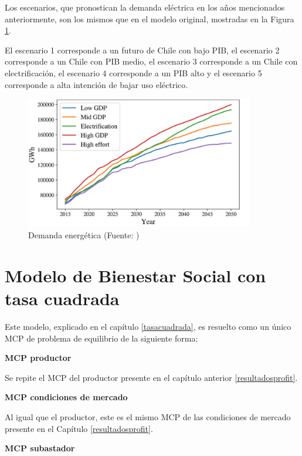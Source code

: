 Los escenarios, que pronostican la demanda eléctrica en los años mencionados anteriormente, son los mismos que en el modelo original, mostradas en la Figura \ref{fig:demandaescenarios}. 
\vspace{2.5mm}

El escenario 1 corresponde a un futuro de Chile con bajo PIB, el escenario 2 corresponde a un Chile con PIB medio, el escenario 3 corresponde a un Chile con electrificación, el escenario 4 corresponde a un PIB alto y el escenario 5 corresponde a alta intención de bajar uso eléctrico. 
\vspace{2.5mm}


\begin{figure}[H]
    \centering
    \includegraphics[width=10cm]{docs/DocumentoMemoria/core/images/demanda energetica segun escenario.png}
    \caption{{\footnotesize Demanda energética (Fuente: \protect{})}}
    \label{fig:demandaescenarios}
\end{figure}


\section{Modelo de Bienestar Social con tasa cuadrada}

Este modelo, explicado en el capítulo \ref{tasacuadrada}, es resuelto como un único MCP de problema de equilibrio de la siguiente forma:
\vspace{2.5mm}

\textbf{MCP productor}

Se repite el MCP del productor presente en el capítulo anterior \ref{resultadosprofit}.

\textbf{MCP condiciones de mercado}

Al igual que el productor, este es el mismo MCP de las condiciones de mercado presente en el Capítulo \ref{resultadosprofit}.

\textbf{MCP subastador}

